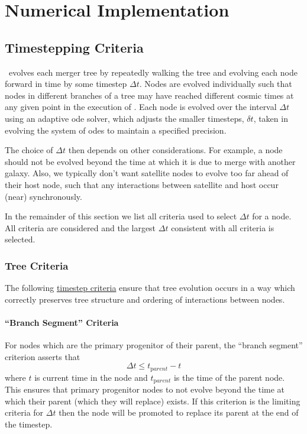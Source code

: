 \chapter{Numerical Implementation}

\section{Timestepping Criteria}\label{sec:TimesteppingCriteria}

\glc\ evolves each merger tree by repeatedly walking the tree and evolving each node forward in time by some timestep $\Delta t$. Nodes are evolved individually such that nodes in different branches of a tree may have reached different cosmic times at any given point in the execution of \glc. Each node is evolved over the interval $\Delta t$ using an adaptive \gls{ode} solver, which adjusts the smaller timesteps, $\delta t$, taken in evolving the system of \glspl{ode} to maintain a specified precision.

The choice of $\Delta t$ then depends on other considerations. For example, a node should not be evolved beyond the time at which it is due to merge with another galaxy. Also, we typically don't want satellite nodes to evolve too far ahead of their host node, such that any interactions between satellite and host occur (near) synchronously.

In the remainder of this section we list all criteria used to select $\Delta t$ for a node. All criteria are considered and the largest $\Delta t$ consistent with all criteria is selected.

\subsection{Tree Criteria}

The following \hyperlink{merger_trees.evolve.F90:merger_trees_evolve:evolve_to_time}{timestep criteria} ensure that tree evolution occurs in a way which correctly preserves tree structure and ordering of interactions between \glspl{node}.

\subsubsection{``Branch Segment'' Criteria}

For \glspl{node} which are the \gls{primary progenitor} of their \gls{parent}, the ``branch segment'' criterion asserts that
\begin{equation}
 \Delta t \le t_{\mathrm parent} - t
\end{equation}
where $t$ is current time in the \gls{node} and $t_{\mathrm parent}$ is the time of the \gls{parent} \gls{node}. This ensures that \gls{primary progenitor} \glspl{node} to not evolve beyond the time at which their \gls{parent} (which they will replace) exists.  If this criterion is the limiting criteria for $\Delta t$ then the \gls{node} will be promoted to replace its \gls{parent} at the end of the timestep. 

